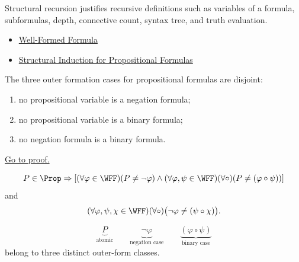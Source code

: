 \begin{remark*}[Interpretation]
Structural recursion justifies recursive definitions such as variables of a formula, subformulas, depth, connective count, syntax tree, and truth evaluation.
\end{remark*}

\begin{dependencies}
\begin{itemize}
  \item \hyperref[def:well-formed-formula]{Well-Formed Formula}
  \item \hyperref[thm:structural-induction-propositional-formulas]{Structural Induction for Propositional Formulas}
\end{itemize}
\end{dependencies}
\begin{tcolorbox}[colback=lembox, colframe=lemborder, arc=2pt,
  left=6pt, right=6pt, top=4pt, bottom=4pt,
  title={\small\textbf{Lemma (Constructor Disjointness for Propositional Formulas)}},
  fonttitle=\small\bfseries]
\begin{lemma}
\label{lem:constructor-disjointness-propositional-formulas}
The three outer formation cases for propositional formulas are disjoint:
\begin{enumerate}
\item no propositional variable is a negation formula;
\item no propositional variable is a binary formula;
\item no negation formula is a binary formula.
\end{enumerate}

\noindent\hyperref[prf:constructor-disjointness-propositional-formulas]{Go to proof.}
\end{lemma}
\end{tcolorbox}

\begin{remark*}
\[
P\in\Prop\Rightarrow
\left[
(\forall\varphi\in\WFF)(P\ne\neg\varphi)
\land
(\forall\varphi,\psi\in\WFF)(\forall\circ)(P\ne(\varphi\circ\psi))
\right]
\]
and
\[
(\forall\varphi,\psi,\chi\in\WFF)(\forall\circ)
\bigl(\neg\varphi\ne(\psi\circ\chi)\bigr).
\]
\end{remark*}

\begin{remark*}
\[
\underbrace{P}_{\text{atomic}}
\qquad
\underbrace{\neg\varphi}_{\text{negation case}}
\qquad
\underbrace{(\varphi\circ\psi)}_{\text{binary case}}
\]
belong to three distinct outer-form classes.
\end{remark*}

